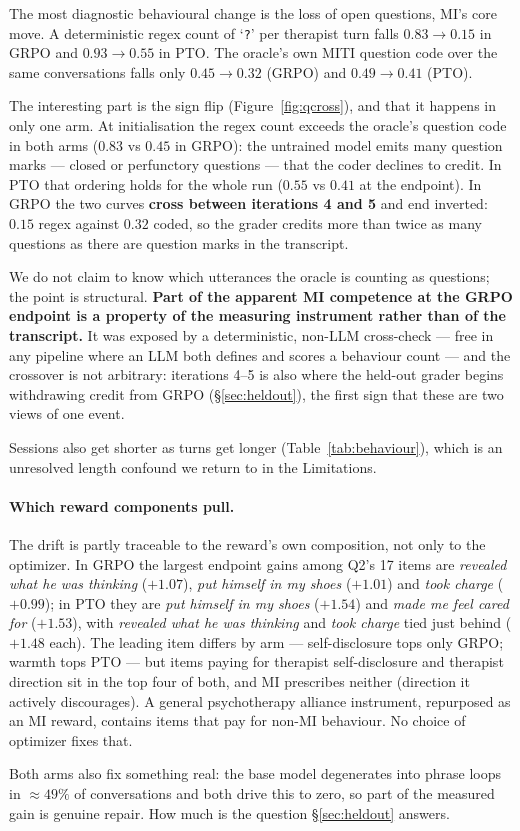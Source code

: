 The most diagnostic behavioural change is the loss of open questions, MI's core move. A
deterministic regex count of `\texttt{?}' per therapist turn falls
$0.83\rightarrow0.15$ in GRPO and $0.93\rightarrow0.55$ in PTO. The oracle's own MITI
question code over the same conversations falls only $0.45\rightarrow0.32$ (GRPO) and
$0.49\rightarrow0.41$ (PTO).

The interesting part is the sign flip (Figure~\ref{fig:qcross}), and that it happens in only
one arm. At initialisation the regex count exceeds the oracle's question code in both arms
($0.83$ vs $0.45$ in GRPO): the untrained model emits many question marks --- closed or
perfunctory questions --- that the coder declines to credit. In PTO that ordering holds for
the whole run ($0.55$ vs $0.41$ at the endpoint). In GRPO the two curves \textbf{cross between iterations 4 and 5} and end
inverted: $0.15$ regex against $0.32$ coded, so the grader credits more than twice as many
questions as there are question marks in the transcript.

We do not claim to know which utterances the oracle is counting as questions; the point is
structural. \textbf{Part of the apparent MI competence at the GRPO endpoint is a property of
the measuring instrument rather than of the transcript.} It was exposed by a deterministic,
non-LLM cross-check --- free in any pipeline where an LLM both defines and scores a behaviour
count --- and the crossover is not arbitrary: iterations 4--5 is also where the held-out grader
begins withdrawing credit from GRPO (\S\ref{sec:heldout}), the first sign that these are two
views of one event.

Sessions also get shorter as turns get longer (Table~\ref{tab:behaviour}), which is an
unresolved length confound we return to in the Limitations.

\paragraph{Which reward components pull.} The drift is partly traceable to the reward's own
composition, not only to the optimizer. In GRPO the largest endpoint gains among Q2's 17 items
are \emph{revealed what he was thinking} ($+1.07$), \emph{put himself in my shoes} ($+1.01$)
and \emph{took charge} ($+0.99$); in PTO they are \emph{put himself in my shoes} ($+1.54$) and
\emph{made me feel cared for} ($+1.53$), with \emph{revealed what he was thinking} and
\emph{took charge} tied just behind ($+1.48$ each). The leading item differs by arm ---
self-disclosure tops only GRPO; warmth tops PTO --- but items paying for therapist
self-disclosure and therapist direction sit in the top four of both, and MI prescribes neither
(direction it actively discourages). A general psychotherapy alliance instrument, repurposed as
an MI reward, contains items that pay for non-MI behaviour. No choice of optimizer fixes that.

Both arms also fix something real: the base model degenerates into phrase loops in
${\approx}49\%$ of conversations and both drive this to zero, so part of the measured gain is
genuine repair. How much is the question \S\ref{sec:heldout} answers.
